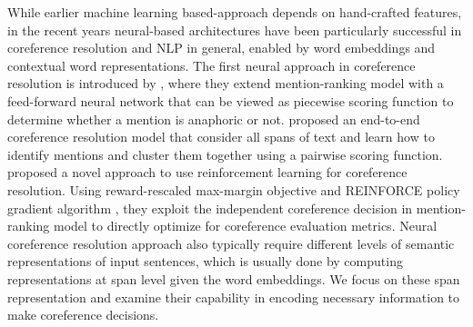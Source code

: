 \documentclass[11pt]{article}
\begin{document}
While earlier machine learning based-approach depends on hand-crafted features, in the recent years neural-based architectures have been particularly successful in coreference resolution and NLP in general, enabled by word embeddings and contextual word representations. The first neural approach in coreference resolution is introduced by \parencite{wiseman2015learning}, where they extend mention-ranking model with a feed-forward neural network that can be viewed as piecewise scoring function to determine whether a mention is anaphoric or not. \parencite{lee2017end} proposed an end-to-end coreference resolution model that consider all spans of text and learn how to identify mentions and cluster them together using a pairwise scoring function. \parencite{clark2016deep} proposed a novel approach to use reinforcement learning for coreference resolution. Using reward-rescaled max-margin objective and REINFORCE policy gradient algorithm \parencite{reinforce}, they exploit the independent coreference decision in mention-ranking model to directly optimize for coreference evaluation metrics. Neural coreference resolution approach also typically require different levels of semantic representations of input sentences, which is usually done by computing representations at span level given the word embeddings. We focus on these span representation and examine their capability in encoding necessary information to make coreference decisions. 




\end{document}

